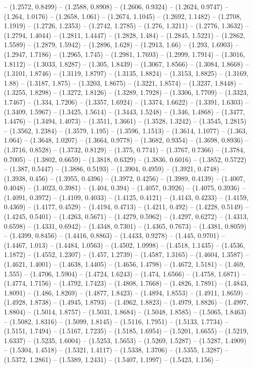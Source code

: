 -- (1.2572, 0.8499) -- (1.2588, 0.8908) -- (1.2606, 0.9324) -- (1.2624, 0.9747) -- (1.264, 1.0176) -- (1.2658, 1.061) -- (1.2674, 1.1045) -- (1.2692, 1.1482) -- (1.2708, 1.1919) -- (1.2726, 1.2353) -- (1.2742, 1.2785) -- (1.276, 1.3211) -- (1.2776, 1.3632) -- (1.2794, 1.4044) -- (1.2811, 1.4447) -- (1.2828, 1.484) -- (1.2845, 1.5221) -- (1.2862, 1.5589) -- (1.2879, 1.5942) -- (1.2896, 1.628) -- (1.2913, 1.66) -- (1.293, 1.6903) -- (1.2947, 1.7186) -- (1.2965, 1.745) -- (1.2981, 1.7693) -- (1.2999, 1.7914) -- (1.3016, 1.8112) -- (1.3033, 1.8287) -- (1.305, 1.8439) -- (1.3067, 1.8566) -- (1.3084, 1.8668) -- (1.3101, 1.8746) -- (1.3119, 1.8797) -- (1.3135, 1.8824) -- (1.3153, 1.8825) -- (1.3169, 1.88) -- (1.3187, 1.875) -- (1.3203, 1.8675) -- (1.3221, 1.8574) -- (1.3237, 1.8448) -- (1.3255, 1.8298) -- (1.3272, 1.8126) -- (1.3289, 1.7928) -- (1.3306, 1.7709) -- (1.3323, 1.7467) -- (1.334, 1.7206) -- (1.3357, 1.6924) -- (1.3374, 1.6622) -- (1.3391, 1.6303) -- (1.3409, 1.5967) -- (1.3425, 1.5614) -- (1.3443, 1.5248) -- (1.346, 1.4868) -- (1.3477, 1.4476) -- (1.3494, 1.4073) -- (1.3511, 1.3661) -- (1.3528, 1.3242) -- (1.3545, 1.2815) -- (1.3562, 1.2384) -- (1.3579, 1.195) -- (1.3596, 1.1513) -- (1.3614, 1.1077) -- (1.363, 1.064) -- (1.3648, 1.0207) -- (1.3664, 0.9778) -- (1.3682, 0.9354) -- (1.3698, 0.8936) -- (1.3716, 0.8528) -- (1.3732, 0.8129) -- (1.375, 0.7741) -- (1.3767, 0.7366) -- (1.3784, 0.7005) -- (1.3802, 0.6659) -- (1.3818, 0.6329) -- (1.3836, 0.6016) -- (1.3852, 0.5722) -- (1.387, 0.5447) -- (1.3886, 0.5193) -- (1.3904, 0.4959) -- (1.3921, 0.4748) -- (1.3938, 0.456) -- (1.3955, 0.4396) -- (1.3972, 0.4256) -- (1.3989, 0.4139) -- (1.4007, 0.4048) -- (1.4023, 0.3981) -- (1.404, 0.394) -- (1.4057, 0.3926) -- (1.4075, 0.3936) -- (1.4091, 0.3972) -- (1.4109, 0.4033) -- (1.4125, 0.4121) -- (1.4143, 0.4233) -- (1.4159, 0.4369) -- (1.4177, 0.4529) -- (1.4194, 0.4713) -- (1.4211, 0.492) -- (1.4228, 0.5149) -- (1.4245, 0.5401) -- (1.4263, 0.5671) -- (1.4279, 0.5962) -- (1.4297, 0.6272) -- (1.4313, 0.6598) -- (1.4331, 0.6942) -- (1.4348, 0.7301) -- (1.4365, 0.7673) -- (1.4381, 0.8059) -- (1.4399, 0.8456) -- (1.4416, 0.8863) -- (1.4433, 0.9278) -- (1.445, 0.9701) -- (1.4467, 1.013) -- (1.4484, 1.0563) -- (1.4502, 1.0998) -- (1.4518, 1.1435) -- (1.4536, 1.1872) -- (1.4552, 1.2307) -- (1.457, 1.2739) -- (1.4587, 1.3165) -- (1.4604, 1.3587) -- (1.4621, 1.4001) -- (1.4638, 1.4405) -- (1.4656, 1.4798) -- (1.4672, 1.5181) -- (1.469, 1.555) -- (1.4706, 1.5904) -- (1.4724, 1.6243) -- (1.474, 1.6566) -- (1.4758, 1.6871) -- (1.4774, 1.7156) -- (1.4792, 1.7423) -- (1.4808, 1.7668) -- (1.4826, 1.7891) -- (1.4843, 1.8091) -- (1.486, 1.8269) -- (1.4877, 1.8423) -- (1.4894, 1.8553) -- (1.4911, 1.8659) -- (1.4928, 1.8738) -- (1.4945, 1.8793) -- (1.4962, 1.8823) -- (1.4979, 1.8826) -- (1.4997, 1.8804) -- (1.5014, 1.8757) -- (1.5031, 1.8684) -- (1.5048, 1.8585) -- (1.5065, 1.8463) -- (1.5082, 1.8316) -- (1.5099, 1.8145) -- (1.5116, 1.7951) -- (1.5133, 1.7734) -- (1.5151, 1.7494) -- (1.5167, 1.7235) -- (1.5185, 1.6954) -- (1.5201, 1.6655) -- (1.5219, 1.6337) -- (1.5235, 1.6004) -- (1.5253, 1.5653) -- (1.5269, 1.5287) -- (1.5287, 1.4909) -- (1.5304, 1.4518) -- (1.5321, 1.4117) -- (1.5338, 1.3706) -- (1.5355, 1.3287) -- (1.5372, 1.2861) -- (1.5389, 1.2431) -- (1.5407, 1.1997) -- (1.5423, 1.156) -- 